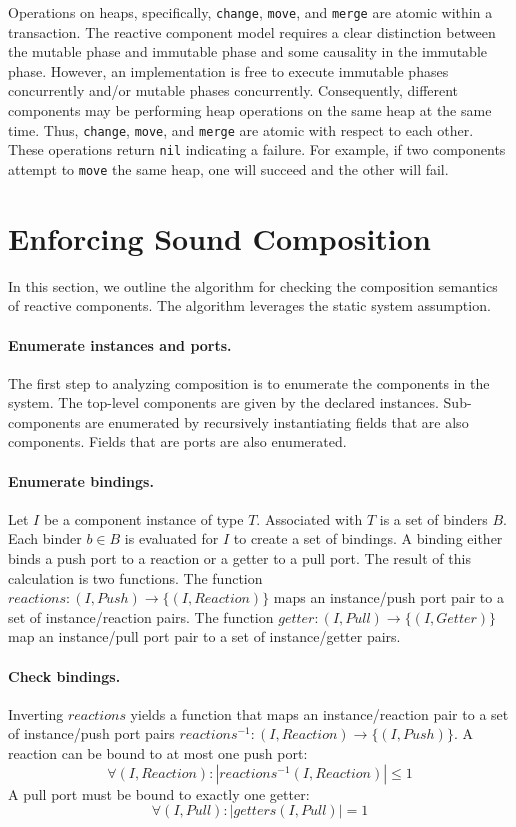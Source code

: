 Operations on heaps, specifically, \verb+change+, \verb+move+, and \verb+merge+ are atomic within a transaction.
The reactive component model requires a clear distinction between the mutable phase and immutable phase and some causality in the immutable phase.
However, an implementation is free to execute immutable phases concurrently and/or mutable phases concurrently.
Consequently, different components may be performing heap operations on the same heap at the same time.
Thus, \verb+change+, \verb+move+, and \verb+merge+ are atomic with respect to each other.
These operations return \verb+nil+ indicating a failure.
For example, if two components attempt to \verb+move+ the same heap, one will succeed and the other will fail.

\section{Enforcing Sound Composition}

In this section, we outline the algorithm for checking the composition semantics of reactive components.
The algorithm leverages the static system assumption.

\paragraph{Enumerate instances and ports.}
The first step to analyzing composition is to enumerate the components in the system.
The top-level components are given by the declared instances.
Sub-components are enumerated by recursively instantiating fields that are also components.
Fields that are ports are also enumerated.

\paragraph{Enumerate bindings.}
Let $I$ be a component instance of type $T$.
Associated with $T$ is a set of binders $B$.
Each binder $b \in B$ is evaluated for $I$ to create a set of bindings.
A binding either binds a push port to a reaction or a getter to a pull port.
The result of this calculation is two functions.
The function $reactions: (I,Push) \to \{(I,Reaction)\}$ maps an instance/push port pair to a set of instance/reaction pairs.
The function $getter: (I,Pull) \to \{(I,Getter)\}$ map an instance/pull port pair to a set of instance/getter pairs.

\paragraph{Check bindings.}
Inverting $reactions$ yields a function that maps an instance/reaction pair to a set of instance/push port pairs $reactions^{-1}: (I,Reaction) \to \{(I,Push)\}$.
A reaction can be bound to at most one push port:
\begin{displaymath}
\forall (I,Reaction) : |reactions^{-1} (I,Reaction)| \leq 1
\end{displaymath}
A pull port must be bound to exactly one getter:
\begin{displaymath}
\forall (I,Pull) : |getters (I,Pull)| = 1
\end{displaymath}

